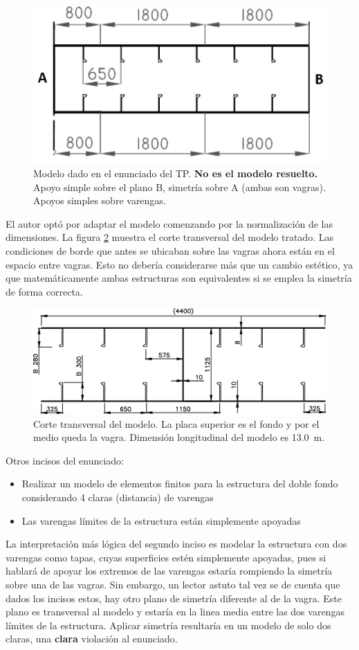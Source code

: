 \documentclass[onecolumn,10pt,titlepage]{article}
\begin{document}
\begin{figure}[htb!]
	\centering
	\includegraphics[draft,width=.5\textwidth]{fig/modelocatedra.png}
	\caption{Modelo dado en el enunciado del TP. \textbf{No es el modelo resuelto.} Apoyo simple sobre el plano B, simetría sobre A (ambas son vagras). Apoyos simples sobre varengas.}
	\label{fig:modelocatedra}
\end{figure}
El autor optó por adaptar el modelo comenzando por la normalización de las dimensiones. La figura \ref{fig:modeloTransversal} muestra el corte transversal del modelo tratado. Las condiciones de borde que antes se ubicaban sobre las vagras ahora están en el espacio entre vagras. Esto no debería considerarse más que un cambio estético, ya que matemáticamente ambas estructuras son equivalentes si se emplea la simetría de forma correcta.
\begin{figure}[htb!]
	\centering
	\includegraphics[width=0.7\linewidth]{fig/MODELO.eps}
	\caption{Corte transversal del modelo. La placa superior es el fondo y por el medio queda la vagra. Dimensión longitudinal del modelo es \SI{13,0}{\meter}.}
	\label{fig:modeloTransversal}
\end{figure}

Otros incisos del enunciado:
\begin{itemize}
	\item Realizar un modelo de elementos finitos para la estructura del doble fondo considerando 4 claras (distancia) de varengas
	\item Las varengas límites de la estructura están simplemente apoyadas
\end{itemize}
La interpretación más lógica del segundo inciso es modelar la estructura con dos varengas como tapas, cuyas superficies estén simplemente apoyadas, pues si hablará de apoyar los extremos de las varengas estaría rompiendo la simetría sobre una de las vagras. Sin embargo, un lector astuto tal vez se de cuenta que dados los incisos estos, hay otro plano de simetría diferente al de la vagra. Este plano es transversal al modelo y estaría en la linea media entre las dos varengas límites de la estructura. Aplicar simetría resultaría en un modelo de solo dos claras, una \textbf{clara} violación al enunciado.
\end{document}
